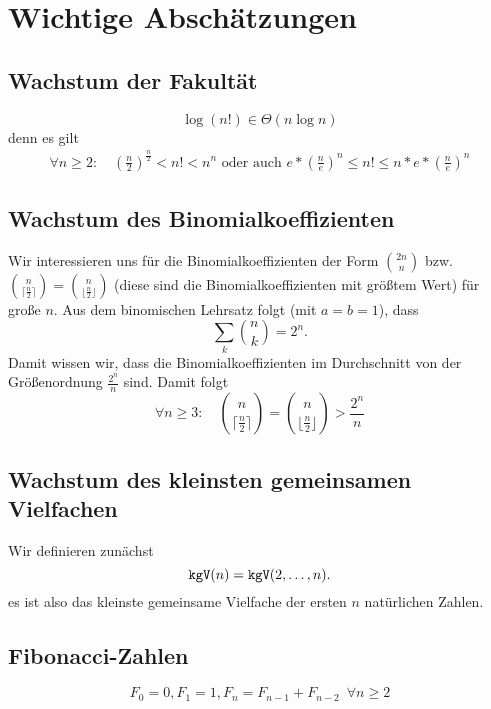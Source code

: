 \chapter{Wichtige Abschätzungen}

\section{Wachstum der Fakultät}
\begin{equation*}
	\log(n!)\in \Theta(n\log n)
\end{equation*}
denn es gilt 
\begin{align*}
	\forall n\geq 2:\quad \left(\frac n2\right)^{\frac n2} < n! < n^n \text{ oder auch } e*\left(\frac ne\right)^n\leq n!\leq n*e*\left(\frac ne\right)^n
\end{align*}

\section{Wachstum des Binomialkoeffizienten}
Wir interessieren uns für die Binomialkoeffizienten der Form $\binom{2n}{n}$ bzw. $\binom{n}{\lceil \frac n2\rceil}=\binom{n}{\lfloor \frac n2\rfloor}$ (diese sind die Binomialkoeffizienten mit größtem Wert) für große $n$.
Aus dem binomischen Lehrsatz folgt (mit $a=b=1$), dass
\begin{equation*}
	\sum_k\binom nk = 2^n.
\end{equation*}
Damit wissen wir, dass die Binomialkoeffizienten im Durchschnitt von der Größenordnung $\frac{2^n}n$ sind. Damit folgt
\begin{equation*}
	\forall n\geq 3:\quad\binom{n}{\lceil \frac n2\rceil}=\binom{n}{\lfloor \frac n2\rfloor}>\frac{2^n}n
\end{equation*}



\section{Wachstum des kleinsten gemeinsamen Vielfachen}
Wir definieren zunächst
\begin{equation*}
	\texttt{kgV}(n)=\texttt{kgV}(2,\ldots,n).
\end{equation*}
es ist also das kleinste gemeinsame Vielfache der ersten $n$ natürlichen Zahlen.

\section{Fibonacci-Zahlen}
\begin{equation*}
	F_0 = 0, F_1=1, F_n=F_{n-1}+F_{n-2}\enspace\forall n\geq 2
\end{equation*}

